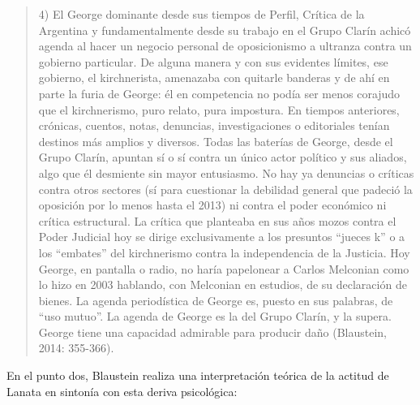 \begin{quote}
4) El George dominante desde sus tiempos de Perfil, Crítica de la Argentina y fundamentalmente desde su trabajo en el Grupo Clarín achicó agenda al hacer un negocio personal de oposicionismo a ultranza contra un gobierno particular. De alguna manera y con sus evidentes límites, ese gobierno, el kirchnerista, amenazaba con quitarle banderas y de ahí en parte la furia de George: él en competencia no podía ser menos corajudo que el kirchnerismo, puro relato, pura impostura. En tiempos anteriores, crónicas, cuentos, notas, denuncias, investigaciones o editoriales tenían destinos más amplios y diversos. Todas las baterías de George, desde el Grupo Clarín, apuntan sí o sí contra un único actor político y sus aliados, algo que él desmiente sin mayor entusiasmo. No hay ya denuncias o críticas contra otros sectores (sí para cuestionar la debilidad general que padeció la oposición por lo menos hasta el 2013) ni contra el poder económico ni crítica estructural. La crítica que planteaba en sus años mozos contra el Poder Judicial hoy se dirige exclusivamente a los presuntos \enquote{jueces k} o a los \enquote{embates} del kirchnerismo contra la independencia de la Justicia. Hoy George, en pantalla o radio, no haría papelonear a Carlos Melconian como lo hizo en 2003 hablando, con Melconian en estudios, de su declaración de bienes. La agenda periodística de George es, puesto en sus palabras, de \enquote{uso mutuo}. La agenda de George es la del Grupo Clarín, y la supera. George tiene una capacidad admirable para producir daño (Blaustein, 2014: 355-366).
\end{quote}

En el punto dos, Blaustein realiza una interpretación teórica de la actitud de Lanata en sintonía con esta deriva psicológica:

